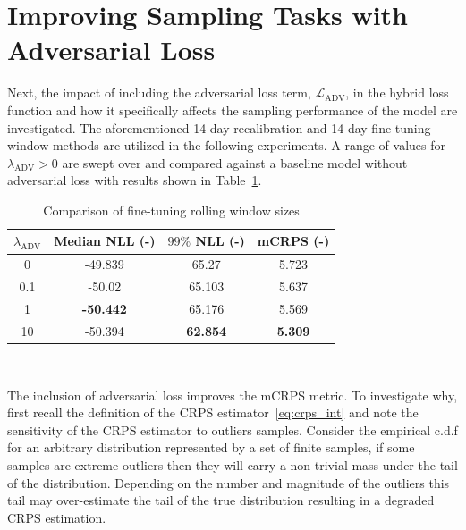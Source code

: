 \section{Improving Sampling Tasks with Adversarial Loss}\label{sec:improving-sampling-tasks}

Next, the impact of including the adversarial loss term, $\mathcal{L}_{\text{ADV}}$, in the hybrid loss function and
how it specifically affects the sampling performance of the model are investigated.
The aforementioned 14-day recalibration and 14-day fine-tuning window methods are utilized in the following experiments.
A range of values for $\lambda_{\text{ADV}} > 0$ are swept over and compared against a baseline model without adversarial
loss with results shown in Table~\ref{tab:ganloss}.

\begin{table}[htb]
    \caption[Results of adversarial loss inclusion]{
        Comparison of fine-tuning rolling window sizes
    }
    \begin{center}
        \begin{tabular}{||c|c|c|c||} \hline
        $\lambda_{\text{ADV}}$ & Median NLL (-)  & $99\%$ NLL (-) & mCRPS (-)  \\	%
        \hline \hline
        0   &         -49.839  &         65.27   &         5.723 \\ \hline
        0.1 &         -50.02   &         65.103  &         5.637 \\ \hline
        1   & \textbf{-50.442} &         65.176  &         5.569 \\ \hline
        10  &         -50.394  & \textbf{62.854} & \textbf{5.309} \\ \hline
        \end{tabular}
        \\ \rule{0mm}{5mm}
    \end{center}
    \label{tab:ganloss}
\end{table}
The inclusion of adversarial loss improves the mCRPS metric.
To investigate why, first recall the definition of the CRPS estimator~\ref{eq:crps_int} and note the sensitivity of the
CRPS estimator to outliers samples.
Consider the empirical c.d.f for an arbitrary distribution represented by a set of finite samples, if some samples
are extreme outliers then they will carry a non-trivial mass under the tail of the distribution.
Depending on the number and magnitude of the outliers this tail may over-estimate the tail of the true distribution
resulting in a degraded CRPS estimation.


